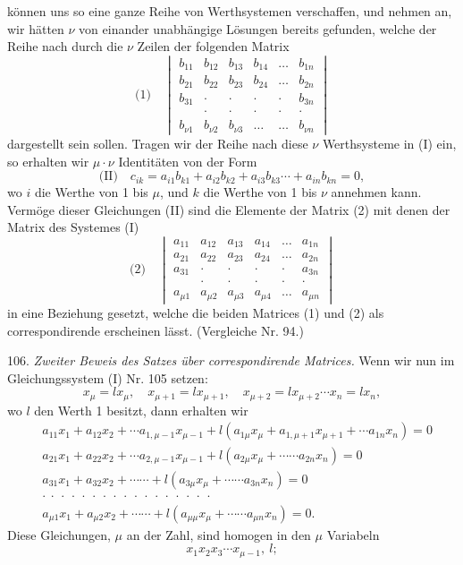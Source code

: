 können uns so eine ganze Reihe von Werthsystemen verschaffen, und nehmen an, wir hätten $\nu$ von einander unabhängige Lösungen bereits gefunden, welche der Reihe nach durch die $\nu$ Zeilen der folgenden Matrix
\[
\text{(1)}\quad
\begin{vmatrix}
b_{11} & b_{12} & b_{13} & b_{14} & \ldots & b_{1n} \\
b_{21} & b_{22} & b_{23} & b_{24} & \ldots & b_{2n} \\
b_{31} & \cdot & \cdot & \cdot & \cdot & b_{3n} \\
 & \cdot & \cdot & \cdot & \cdot & \cdot \\
b_{\nu1} & b_{\nu2} & b_{\nu3} & \ldots & \ldots & b_{\nu n}
\end{vmatrix}
\]
dargestellt sein sollen. Tragen wir der Reihe nach diese $\nu$ Werthsysteme in (I) ein, so erhalten wir $\mu\cdot\nu$ Identitäten von der Form
\[
\text{(II)}\quad c_{ik}=a_{i1}b_{k1}+a_{i2}b_{k2}+a_{i3}b_{k3}\cdots+a_{in}b_{kn}=0,
\]
wo $i$ die Werthe von 1 bis $\mu$, und $k$ die Werthe von 1 bis $\nu$ annehmen kann. Vermöge dieser Gleichungen (II) sind die Elemente der Matrix (2) mit denen der Matrix des Systemes (I)
\[
\text{(2)}\quad
\begin{vmatrix}
a_{11} & a_{12} & a_{13} & a_{14} & \ldots & a_{1n} \\
a_{21} & a_{22} & a_{23} & a_{24} & \ldots & a_{2n} \\
a_{31} & \cdot & \cdot & \cdot & \cdot & a_{3n} \\
 & \cdot & \cdot & \cdot & \cdot & \cdot \\
a_{\mu1} & a_{\mu2} & a_{\mu3} & a_{\mu4} & \ldots & a_{\mu n}
\end{vmatrix}
\]
in eine Beziehung gesetzt, welche die beiden Matrices (1) und (2) als correspondirende erscheinen lässt. (Vergleiche Nr. 94.)

106. \textit{Zweiter Beweis des Satzes über correspondirende Matrices.} Wenn wir nun im Gleichungssystem (I) Nr. 105 setzen:
\[ x_\mu = lx_\mu, \quad x_{\mu+1}=lx_{\mu+1}, \quad x_{\mu+2}=lx_{\mu+2}\cdots x_n=lx_n, \]
wo $l$ den Werth 1 besitzt, dann erhalten wir
\[
\begin{aligned}
&a_{11}x_1+a_{12}x_2+\cdots a_{1,\mu-1}x_{\mu-1}+l(a_{1\mu}x_\mu+a_{1,\mu+1}x_{\mu+1}+\cdots a_{1n}x_n)=0 \\
&a_{21}x_1+a_{22}x_2+\cdots a_{2,\mu-1}x_{\mu-1}+l(a_{2\mu}x_\mu+\cdots\cdots a_{2n}x_n)=0 \\
&a_{31}x_1+a_{32}x_2+\cdots\cdots+l(a_{3\mu}x_\mu+\cdots\cdots a_{3n}x_n)=0 \\
&\cdot\ \cdot\ \cdot\ \cdot\ \cdot\ \cdot\ \cdot\ \cdot\ \cdot\ \cdot\ \cdot\ \cdot\ \cdot\ \cdot\ \cdot\ \cdot\ \cdot \\
&a_{\mu1}x_1+a_{\mu2}x_2+\cdots\cdots+l(a_{\mu\mu}x_\mu+\cdots\cdots a_{\mu n}x_n)=0.
\end{aligned}
\]
Diese Gleichungen, $\mu$ an der Zahl, sind homogen in den $\mu$ Variabeln
\[ x_1x_2x_3\cdots x_{\mu-1},\ l; \]


